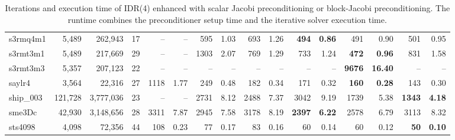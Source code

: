 \begin{landscape}
\begin{table}
\begin{tabular}{lrrr||rr|rr|rr|rr|rr|rr}
	            s3rmq4m1	&	5,489	&	262,943	&	17  &      --  &      --   &      595 &     1.03  &      693 &     1.26  & \textbf{     494} & \textbf{    0.86}  &      491 &     0.90  &      501 &     0.95\\
	            s3rmt3m1	&	5,489	&	217,669	&	29  &      --  &      --   &     1303 &     2.07  &      769 &     1.29  &      733 &     1.24  & \textbf{     472} & \textbf{    0.96}  &      831 &     1.58\\
	            s3rmt3m3	&	5,357	&	207,123	&	22  &      --  &      --   &      --  &      --   &      --  &      --   &      --  &      --   & \textbf{    9676} & \textbf{   16.40}  &      --  &      -- \\
	              saylr4	&	3,564	&	22,316	&	27  &     1118 &     1.77  &      249 &     0.48  &      182 &     0.34  &      171 &     0.32  & \textbf{     160} & \textbf{    0.28}  &      143 &     0.30\\
	            ship\_003	&	121,728	&	3,777,036	&	23  &      --  &      --   &     2731 &     8.12  &     2488 &     7.37  &     3042 &     9.19  &     1739 &     5.38  & \textbf{    1343} & \textbf{    4.18}\\
	              sme3Dc	&	42,930	&	3,148,656	&	28  &     3311 &     7.87  &     2945 &     7.58  &     3178 &     8.19  & \textbf{    2397} & \textbf{    6.22}  &     2578 &     6.79  &     3113 &     8.32\\
	             sts4098	&	4,098	&	72,356	&	44  &      108 &     0.23  &       77 &     0.17  &       83 &     0.16  &       60 &     0.14  &       60 &     0.12  & \textbf{      50} & \textbf{    0.10}\\
\hline
\hline
\end{tabular}

\caption{Iterations and execution time of IDR(4) enhanced with scalar Jacobi preconditioning or block-Jacobi preconditioning.\newline
The runtime combines the preconditioner setup time and the iterative solver execution time.}
\label{2017-lu-block-jacobi:tab:idr4comparison}
\end{table}
\end{landscape}
